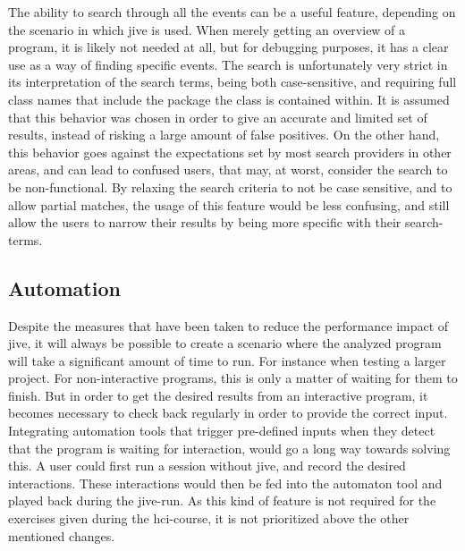 The ability to search through all the events can be a useful feature, depending on the scenario in which \gls{jive} is used.
When merely getting an overview of a program, it is likely not needed at all, but for debugging purposes, it has a clear use as a way of finding specific events.
The search is unfortunately very strict in its interpretation of the search terms, being both case-sensitive, and requiring full class names that include the package the class is contained within.
It is assumed that this behavior was chosen in order to give an accurate and limited set of results, instead of risking a large amount of false positives.
On the other hand, this behavior goes against the expectations set by most search providers in other areas, and can lead to confused users, that may, at worst, consider the search to be non-functional.
By relaxing the search criteria to not be case sensitive, and to allow partial matches, the usage of this feature would be less confusing, and still allow the users to narrow their results by being more specific with their search-terms.


\subsection{Automation}\label{jiveSuggestionsAutomation}

Despite the measures that have been taken to reduce the performance impact of \gls{jive}, it will always be possible to create a scenario where the analyzed program will take a significant amount of time to run.
For instance when testing a larger project.
For non-interactive programs, this is only a matter of waiting for them to finish.
But in order to get the desired results from an interactive program, it becomes necessary to check back regularly in order to provide the correct input.
Integrating automation tools that trigger pre-defined inputs when they detect that the program is waiting for interaction, would go a long way towards solving this.
A user could first run a session without \gls{jive}, and record the desired interactions.
These interactions would then be fed into the automaton tool and played back during the \gls{jive}-run.
As this kind of feature is not required for the exercises given during the \gls{hci}-course, it is not prioritized above the other mentioned changes.




